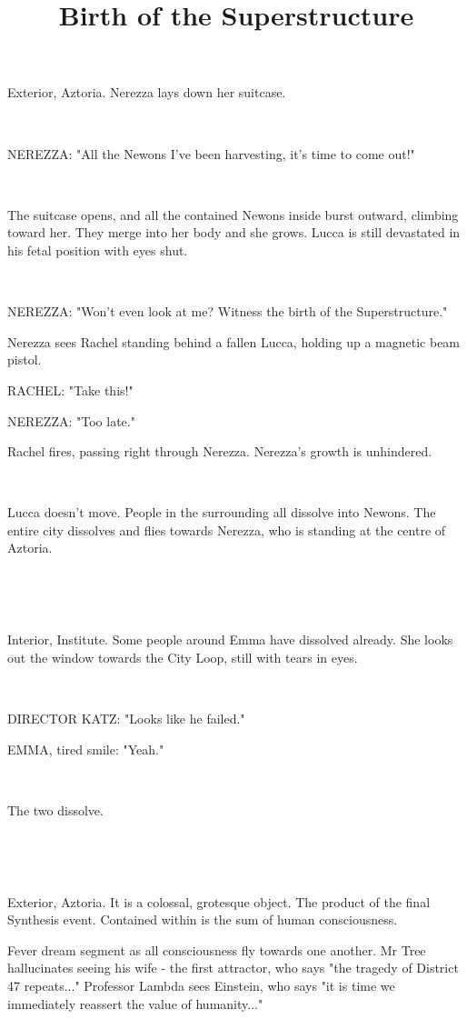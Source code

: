 \documentclass[11pt]{article}
\begin{document}
\ttfamily
\title{Birth of the Superstructure}
\maketitle


Exterior, Aztoria. 
Nerezza lays down her suitcase. 

\ 

NEREZZA: "All the Newons I've been harvesting, it's time to come out!"

\ 

The suitcase opens, and all the contained Newons inside burst outward, climbing toward her.
They merge into her body and she grows.
Lucca is still devastated in his fetal position with eyes shut.

\ 

NEREZZA: "Won't even look at me?
Witness the birth of the Superstructure."

Nerezza sees Rachel standing behind a fallen Lucca, holding up a magnetic beam pistol.

RACHEL: "Take this!"

NEREZZA: "Too late."

Rachel fires, passing right through Nerezza. 
Nerezza's growth is unhindered.

\ 

Lucca doesn't move. 
People in the surrounding all dissolve into Newons.
The entire city dissolves and flies towards Nerezza, who is standing at the centre of Aztoria. 

\ 

\ 

Interior, Institute.
Some people around Emma have dissolved already.
She looks out the window towards the City Loop, still with tears in eyes.

\ 

DIRECTOR KATZ: "Looks like he failed."

EMMA, tired smile: "Yeah."

\ 

The two dissolve.

\ 

\ 

Exterior, Aztoria.
It is a colossal, grotesque object.
The product of the final Synthesis event.
Contained within is the sum of human consciousness.

Fever dream segment as all consciousness fly towards one another.
Mr Tree hallucinates seeing his wife - the first attractor, who says "the tragedy of District 47 repeats..."
Professor Lambda sees Einstein, who says "it is time we immediately reassert the value of humanity..."
\end{document}
